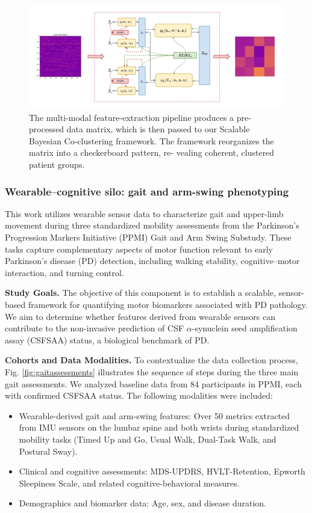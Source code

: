 \documentclass[11pt]{article}
\begin{document}
 \begin{figure}[htbp]
  \centering
  \includegraphics[width=\textwidth]{figures/cc_pd_pipeline.png}
  \caption{The multi-modal feature-extraction pipeline produces a pre-processed data matrix, which is then passed to our Scalable Bayesian Co-clustering framework. The framework reorganizes the matrix into a checkerboard pattern, re-
vealing coherent, clustered patient groups.}
  \label{fig:cc_pd_pipeline}
\end{figure}
 
\subsubsection{Wearable–cognitive silo: gait and arm-swing phenotyping}
This work utilizes wearable sensor data to characterize gait and upper-limb movement during three standardized mobility assessments from the Parkinson’s Progression Markers Initiative (PPMI) Gait and Arm Swing Substudy. These tasks capture complementary aspects of motor function relevant to early Parkinson’s disease (PD) detection, including walking stability, cognitive–motor interaction, and turning control.


\textbf{Study Goals.}
The objective of this component is to establish a scalable, sensor-based framework for quantifying motor biomarkers associated with PD pathology. We aim to determine whether features derived from wearable sensors can contribute to the non-invasive prediction of CSF $\alpha$-synuclein seed amplification assay (CSFSAA) status, a biological benchmark of PD.

\textbf{Cohorts and Data Modalities.}
To contextualize the data collection process, Fig. \ref{fig:gaitassessments} illustrates the sequence of steps during the three main gait assessments. We analyzed baseline data from 84 participants in PPMI, each with confirmed CSFSAA status. The following modalities were included:
\begin{itemize}
    \item Wearable-derived gait and arm-swing features: Over 50 metrics extracted from IMU sensors on the lumbar spine and both wrists during standardized mobility tasks (Timed Up and Go, Usual Walk, Dual-Task Walk, and Postural Sway).
    \item Clinical and cognitive assessments: MDS-UPDRS, HVLT-Retention, Epworth Sleepiness Scale, and related cognitive-behavioral measures.
    \item Demographics and biomarker data: Age, sex, and disease duration.
\end{itemize}
\end{document}
